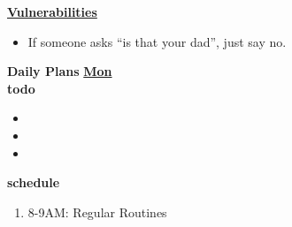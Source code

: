 \documentclass[11pt]{article}
\newcommand{\comments}[1]{}
\begin{document}
{%
\textbf{\small \underline{Vulnerabilities}} \\
\begin{itemize}
\tiny \item \tiny  If someone asks ``is that your dad'', just say no.
\end{itemize} 

\newpage 

\comments{
\noindent\begin{minipage}{\textwidth}
\begin{minipage}[c][6cm][c]{\dimexpr0.5\textwidth-0.5\Colsep\relax}
\lipsum[4]
\end{minipage}\hfill
\begin{minipage}[c][6cm][c]{\dimexpr0.5\textwidth-0.5\Colsep\relax}
\lipsum[4]
\end{minipage}%
\end{minipage}
\lipsum[4]
}


\textbf{Daily Plans} 
\textbf{\small \underline{Mon}} \\
\textbf{\small todo} \\
\begin{itemize}
  \tiny \item \tiny 
  \tiny \item \tiny 
  \tiny \item \tiny 
\end{itemize} 
\textbf{\small schedule} \\
  \begin{enumerate}
    \tiny \item \tiny 8-9AM: Regular Routines 
  \end{enumerate} 

}
\end{document}
